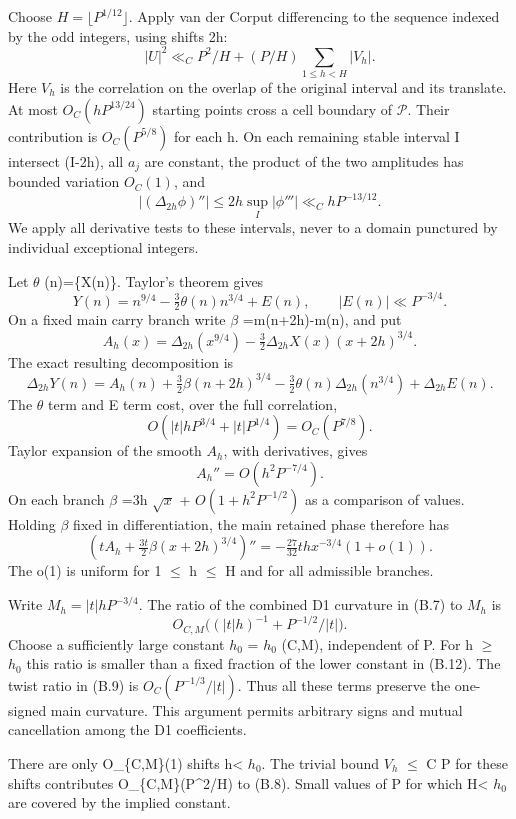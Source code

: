 \documentclass[11pt,a4paper]{article}
\begin{document}
Choose \(H=\lfloor P^{1/12}\rfloor\). Apply van der Corput differencing
to the sequence indexed by the odd integers, using shifts 2h: \[
|U|^2\ll_C P^2/H+(P/H)\sum_{1\le h<H}|V_h|. \tag{B.8}
\] Here \(V_h\) is the correlation on the overlap of the original
interval and its translate. At most \(O_C(h P^{13/24})\) starting points
cross a cell boundary of \(\mathcal P\). Their contribution is
\(O_C(P^{5/8})\) for each h. On each remaining stable interval I
intersect (I-2h), all \(a_j\) are constant, the product of the two
amplitudes has bounded variation \(O_C(1)\), and \[
|(\Delta_{2h}\phi)''|\le 2h\sup_I|\phi'''|
\ll_C hP^{-13/12}. \tag{B.9}
\] We apply all derivative tests to these intervals, never to a domain
punctured by individual exceptional integers.

Let \(\theta\) (n)=\{X(n)\}. Taylor's theorem gives \[
Y(n)=n^{9/4}-\tfrac32\theta(n)n^{3/4}+E(n),
\qquad |E(n)|\ll P^{-3/4}.
\] On a fixed main carry branch write \(\beta\) =m(n+2h)-m(n), and put
\[
A_h(x)=\Delta_{2h}(x^{9/4})
-\tfrac32\Delta_{2h}X(x)(x+2h)^{3/4}.
\] The exact resulting decomposition is \[
\Delta_{2h}Y(n)= A_h(n)+\tfrac32\beta(n+2h)^{3/4}
-\tfrac32\theta(n)\Delta_{2h}(n^{3/4})+\Delta_{2h}E(n). \tag{B.10}
\] The \(\theta\) term and E term cost, over the full correlation, \[
O(|t|hP^{3/4}+|t|P^{1/4})=O_C(P^{7/8}). \tag{B.11}
\] Taylor expansion of the smooth \(A_h\), with derivatives, gives \[
A_h''=O(h^2P^{-7/4}).
\] On each branch \(\beta\) =3h \(\sqrt{x}\) + \(O(1+h^2P^{-1/2})\) as a
comparison of values. Holding \(\beta\) fixed in differentiation, the
main retained phase therefore has \[
\left(tA_h+\tfrac{3t}{2}\beta(x+2h)^{3/4}\right)''
=-\tfrac{27}{32}thx^{-3/4}(1+o(1)). \tag{B.12}
\] The o(1) is uniform for 1 \(\le\) h \(\le\) H and for all admissible
branches.

Write \(M_h=|t|hP^{-3/4}\). The ratio of the combined D1 curvature in
(B.7) to \(M_h\) is \[
O_{C,M}\big((|t|h)^{-1}+P^{-1/2}/|t|\big).
\] Choose a sufficiently large constant \(h_0\) = \(h_0\) (C,M),
independent of P. For h \(\ge\) \(h_0\) this ratio is smaller than a
fixed fraction of the lower constant in (B.12). The twist ratio in (B.9)
is \(O_C(P^{-1/3}/|t|)\). Thus all these terms preserve the one-signed
main curvature. This argument permits arbitrary signs and mutual
cancellation among the D1 coefficients.

There are only O\_\{C,M\}(1) shifts h\textless{} \(h_0\). The trivial
bound \textbar{} \(V_h\) \textbar{} \(\le\) C P for these shifts
contributes O\_\{C,M\}(P\^{}2/H) to (B.8). Small values of P for which
H\textless{} \(h_0\) are covered by the implied constant.
\end{document}
